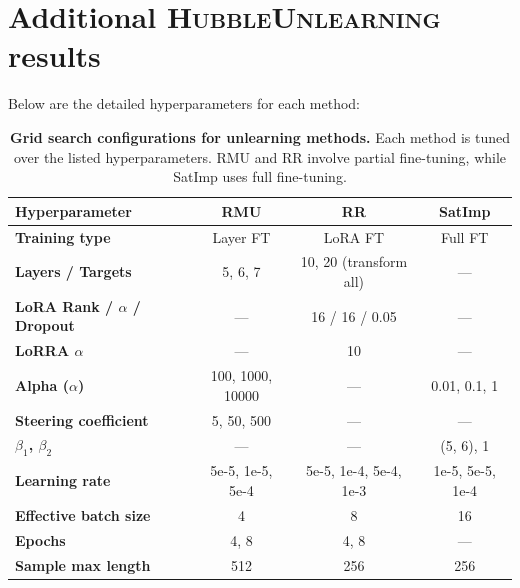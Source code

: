 \newpage
\section{Additional \textsc{HubbleUnlearning} results}
\label{sec:unlearn_grid_search} \label{sec:unlearn_full_results}

Below are the detailed hyperparameters for each method: 

\begin{table}[h]
\centering
\small
\setlength{\tabcolsep}{6pt}
\renewcommand{\arraystretch}{1.2}
\begin{tabular}{lccc}
\toprule
\textbf{Hyperparameter} & \textbf{RMU} & \textbf{RR} & \textbf{SatImp} \\
\midrule
\textbf{Training type} & Layer FT & LoRA FT & Full FT \\
\textbf{Layers / Targets} & 5, 6, 7 & 10, 20 (transform all) & --- \\
\textbf{LoRA Rank / $\alpha$ / Dropout} & --- & 16 / 16 / 0.05 & --- \\
\textbf{LoRRA $\alpha$} & --- & 10 & --- \\
\textbf{Alpha ($\alpha$)} & 100, 1000, 10000 & --- & 0.01, 0.1, 1 \\
\textbf{Steering coefficient} & 5, 50, 500 & --- & --- \\
\textbf{$\beta_1$, $\beta_2$} & --- & --- & (5, 6), 1 \\
\textbf{Learning rate} & 5e-5, 1e-5, 5e-4 & 5e-5, 1e-4, 5e-4, 1e-3 & 1e-5, 5e-5, 1e-4 \\
\textbf{Effective batch size} & 4 & 8 & 16 \\
\textbf{Epochs} & 4, 8 & 4, 8 & --- \\
\textbf{Sample max length} & 512 & 256 & 256 \\
\bottomrule
\end{tabular}
\caption{\textbf{Grid search configurations for unlearning methods.} Each method is tuned over the listed hyperparameters. RMU and RR involve partial fine-tuning, while SatImp uses full fine-tuning.}
\label{tab:unlearn_grid_search}
\end{table}
\clearpage


